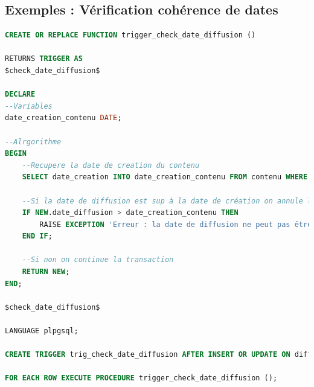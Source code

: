 \subsection{Exemples : Vérification cohérence de dates}
\begin{lstlisting}[language=SQL]
CREATE OR REPLACE FUNCTION trigger_check_date_diffusion ()

RETURNS TRIGGER AS
$check_date_diffusion$

DECLARE
--Variables
date_creation_contenu DATE;

--Alrgorithme
BEGIN
	--Recupere la date de creation du contenu
	SELECT date_creation INTO date_creation_contenu FROM contenu WHERE id = NEW.id_contenu;
	
	--Si la date de diffusion est sup à la date de création on annule la transaction
	IF NEW.date_diffusion > date_creation_contenu THEN
		RAISE EXCEPTION 'Erreur : la date de diffusion ne peut pas être supérieure à la date de creation du contenu';
	END IF;
	
	--Si non on continue la transaction
	RETURN NEW;
END;

$check_date_diffusion$

LANGUAGE plpgsql;

CREATE TRIGGER trig_check_date_diffusion AFTER INSERT OR UPDATE ON diffusion

FOR EACH ROW EXECUTE PROCEDURE trigger_check_date_diffusion ();
\end{lstlisting}

